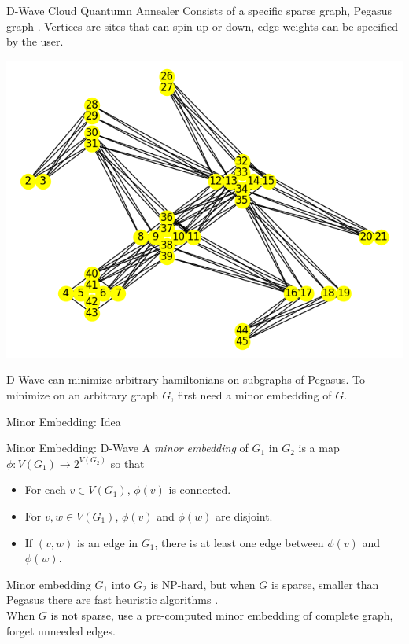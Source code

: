 \documentclass{beamer}
\begin{document}
\begin{frame}{D-Wave Cloud Quantumn Annealer}
	Consists of a specific sparse graph, Pegasus graph \cite{dattani2019pegasus}. Vertices are sites that can spin up or down, edge weights can be specified by the user. \\
	\begin{center}
	\includegraphics[scale=.3]{Plot.png}
	\end{center}
	D-Wave can minimize arbitrary hamiltonians on subgraphs of Pegasus. To minimize on an arbitrary graph $G$, first need a minor embedding of $G$.
	\end{frame}

\begin{frame}{Minor Embedding: Idea}

	\end{frame}

\begin{frame}{Minor Embedding: D-Wave}
 A \emph{minor embedding} of $G_1$ in $G_2$ is a map $\phi: V(G_1) \rightarrow 2^{V(G_2)}$ so that 
	\begin{itemize}
		\item For each $v \in V(G_1)$, $\phi(v)$ is connected.
		\item For $v, w \in V(G_1)$, $\phi(v)$ and $\phi(w)$ are disjoint.
		\item If $(v, w)$ is an edge in $G_1$, there is at least one edge between $\phi(v)$ and $\phi(w)$.
	\end{itemize}

\vspace{10mm}
	Minor embedding $G_1$ into $G_2$ is NP-hard, but when $G$ is sparse, smaller than Pegasus there are fast heuristic algorithms \cite{cai2014practical}.\\
	When $G$ is not sparse, use a pre-computed minor embedding of complete graph, forget unneeded edges.
\end{frame}
\end{document}
